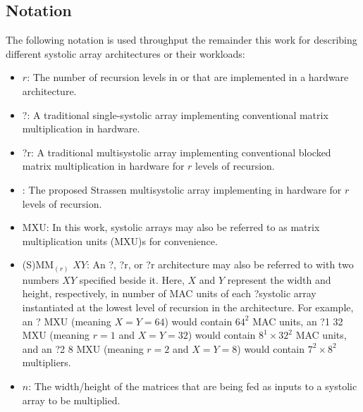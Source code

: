 \subsection{Notation}
The following notation is used throughput the remainder this work for describing different systolic array architectures or their workloads:
\begin{itemize}
\item $r$: The number of recursion levels in  or \seq that are implemented in a hardware architecture.
\item \mm?\zero: A traditional single-systolic array implementing conventional matrix multiplication  in hardware.
\item \mm?r: A traditional multisystolic array implementing conventional blocked matrix multiplication  in hardware for $r$ levels of recursion.
\item \smm: The proposed Strassen multisystolic array implementing \seq in hardware for $r$ levels of recursion.
\item MXU: In this work, systolic arrays may also be referred to as matrix multiplication units (MXU)s for convenience.
\item (S)MM$_{(r)}$ $X$\by$Y$: An \mm?\zero, \mm?r, or \smm?r architecture may also be referred to with two numbers $X$\by$Y$ specified beside it.
  Here, $X$ and $Y$ represent the width and height, respectively, in number of MAC units of each \mm?\zero systolic array instantiated at the lowest level of recursion in the architecture.
  For example, an \mm? MXU (meaning $X = Y = 64$) would contain $64^2$ MAC units, an \mm?1 32 MXU (meaning $r = 1$ and $X = Y = 32$) would contain $8^1\times32^2$ MAC units, and an \smmArch?2 8 MXU (meaning $r = 2$ and $X = Y = 8$) would contain $7^2\times8^2$ multipliers.

\item $n$: The width/height of the matrices that are being fed as inputs to a systolic array to be multiplied.
\end{itemize}
